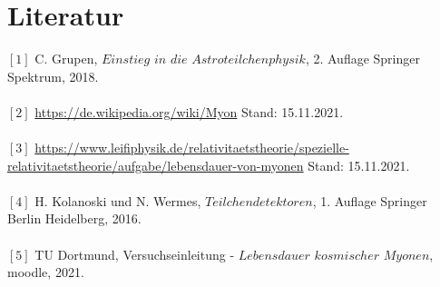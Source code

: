  \section{Literatur}

$[1]$
C. Grupen, $Einstieg$ $in$ $die$ $Astroteilchenphysik$, 2. Auflage Springer Spektrum, 2018.\\
\\
$[2]$
\url{https://de.wikipedia.org/wiki/Myon} Stand: 15.11.2021.\\
\\
$[3]$
 \url{https://www.leifiphysik.de/relativitaetstheorie/spezielle-relativitaetstheorie/aufgabe/lebensdauer-von-myonen} Stand: 15.11.2021. \\
\\
$[4]$
H. Kolanoski und N. Wermes, $Teilchendetektoren$, 1. Auflage Springer Berlin Heidelberg, 2016.\\
\\
$[5]$
TU Dortmund, Versuchseinleitung - $Lebensdauer$ $kosmischer$ $Myonen$, moodle, 2021.\\
\\
